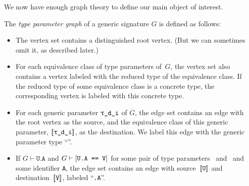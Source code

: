 \documentclass[../generics]{subfiles}
\begin{document}
\smallskip
We now have enough graph theory to define our main object of interest.
\begin{definition}
The \emph{type parameter graph} of a generic signature $G$ is defined as follows:
\begin{itemize}
\item The vertex set contains a distinguished root vertex. (But we can sometimes omit it, as described later.)
\item For each equivalence class of type parameters of~$G$, the vertex set also contains a vertex labeled with the reduced type of the equivalence class. If the reduced type of some equivalence class is a concrete type, the corresponding vertex is labeled with this concrete type.
\item For each generic parameter $\ttgp{d}{i}$ of $G$, the edge set contains an edge with the root vertex as the source, and the equivalence class of this generic parameter, $\EquivClass{\ttgp{d}{i}}$, as the destination. We label this edge with the generic parameter type ``''.
\item If $G\vdash\texttt{U.A}$ and $G\vdash[\texttt{U.A == V}]$ for some pair of type parameters \tT\ and \tU\ and some identifier \texttt{A}, the edge set contains an edge with source~$[\![\texttt{U}]\!]$ and destination~$[\![\texttt{V}]\!]$, labeled ``\texttt{.A}''.
\end{itemize}
\end{definition}
\end{document}
